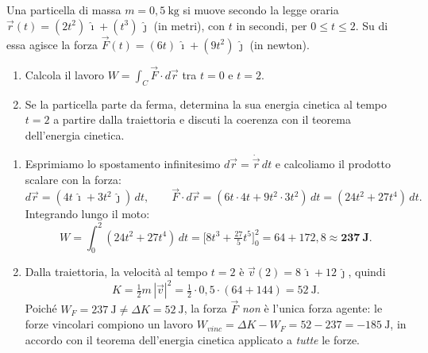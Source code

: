 
\begin{question}[ID=1.5, subtitle={Integrale di linea su traiettoria parametrica}, tags={lavoro, energia, integrale}, difficulty=difficile]
Una particella di massa $m = 0{,}5\ \text{kg}$ si muove secondo la legge oraria $\vec{r}(t) = (2t^2)\,\hat{\imath} + (t^3)\,\hat{\jmath}$ (in metri), con $t$ in secondi, per $0 \le t \le 2$. Su di essa agisce la forza $\vec{F}(t) = (6t)\,\hat{\imath} + (9t^2)\,\hat{\jmath}$ (in newton).
\begin{enumerate}
    \item Calcola il lavoro $W = \int_C \vec{F}\cdot d\vec{r}$ tra $t = 0$ e $t = 2$.
    \item Se la particella parte da ferma, determina la sua energia cinetica al tempo $t = 2$ a partire dalla traiettoria e discuti la coerenza con il teorema dell'energia cinetica.
\end{enumerate}
\begin{solution}
\begin{enumerate}
    \item Esprimiamo lo spostamento infinitesimo $d\vec{r} = \dot{\vec{r}}\,dt$ e calcoliamo il prodotto scalare con la forza:
    \[
    d\vec{r} = (4t\,\hat{\imath} + 3t^2\,\hat{\jmath})\,dt, \qquad
    \vec{F}\cdot d\vec{r} = (6t\cdot 4t + 9t^2\cdot 3t^2)\,dt = (24t^2 + 27t^4)\,dt.
    \]
    Integrando lungo il moto:
    \[
    W = \int_0^2 (24t^2 + 27t^4)\,dt = \bigl[8t^3 + \tfrac{27}{5}t^5\bigr]_0^2 = 64 + 172{,}8 \approx \mathbf{237\ \text{J}}.
    \]
    \item Dalla traiettoria, la velocità al tempo $t = 2$ è $\vec{v}(2) = 8\,\hat{\imath} + 12\,\hat{\jmath}$, quindi
    \[
    K = \tfrac{1}{2}m\,|\vec{v}|^2 = \tfrac{1}{2}\cdot 0{,}5\cdot(64 + 144) = 52\ \text{J}.
    \]
    Poiché $W_F = 237\ \text{J} \neq \Delta K = 52\ \text{J}$, la forza $\vec{F}$ \emph{non} è l'unica forza agente: le forze vincolari compiono un lavoro $W_{vinc} = \Delta K - W_F = 52 - 237 = -185\ \text{J}$, in accordo con il teorema dell'energia cinetica applicato a \emph{tutte} le forze.
\end{enumerate}
\end{solution}
\end{question}

